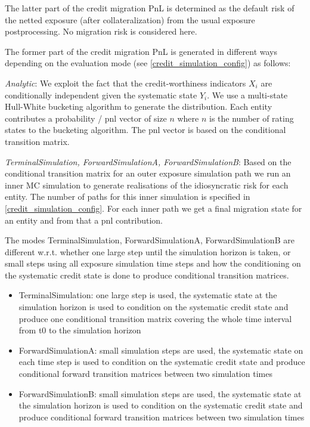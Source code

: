 \documentclass[12pt, a4paper]{article}
\begin{document}
The latter part of the credit migration PnL is determined as the default risk of the netted exposure (after
collateralization) from the usual exposure postprocessing. No migration risk is considered here.

The former part of the credit migration PnL is generated in different ways depending on the evaluation mode (see
\ref{credit_simulation_config}) as follows:

{\em Analytic}: We exploit the fact that the credit-worthiness indicators $X_i$ are conditionally independent given the
systematic state $Y_i$. We use a multi-state Hull-White bucketing algorithm to generate the distribution. Each entity
contributes a probability / pnl vector of size $n$ where $n$ is the number of rating states to the bucketing
algorithm. The pnl vector is based on the conditional transition matrix.

{\em TerminalSimulation, ForwardSimulationA, ForwardSimulationB}: Based on the conditional transition matrix for an
outer exposure simulation path we run an inner MC simulation to generate realisations of the idiosyncratic risk for each
entity. The number of paths for this inner simulation is specified in \ref{credit_simulation_config}. For each inner
path we get a final migration state for an entity and from that a pnl contribution.

The modes TerminalSimulation, ForwardSimulationA, ForwardSimulationB are different w.r.t. whether one large step until
the simulation horizon is taken, or small steps using all exposure simulation time steps and how the conditioning on the
systematic credit state is done to produce conditional transition matrices.

\begin{itemize}
\item TerminalSimulation: one large step is used, the systematic state at the simulation horizon is used to condition on the systematic credit state and produce one conditional transition matrix covering the whole time interval from t0 to the simulation horizon
\item ForwardSimulationA: small simulation steps are used, the systematic state on each time step is used to condition on the systematic credit state and produce conditional forward transition matrices between two simulation times
\item ForwardSimulationB: small simulation steps are used, the systematic state at the simulation horizon is used to condition on the systematic credit state and produce conditional forward transition matrices between two simulation times
\end{itemize}
\end{document}
